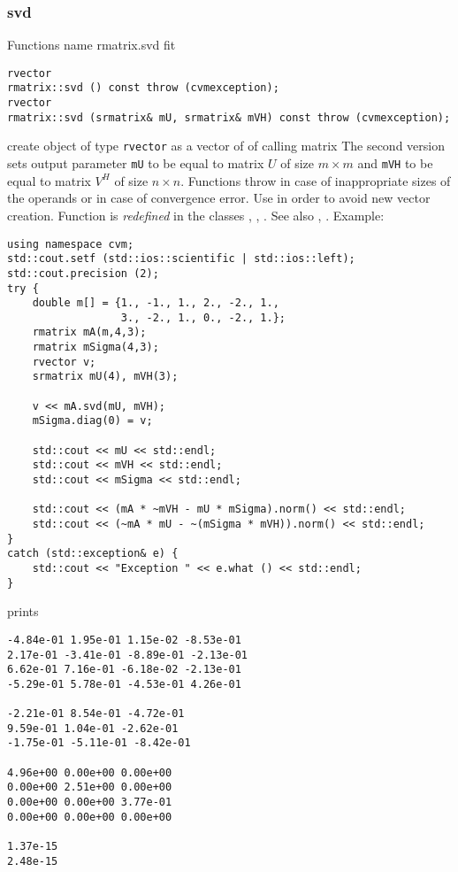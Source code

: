 \subsubsection{svd}
Functions%
\pdfdest name {rmatrix.svd} fit
\begin{verbatim}
rvector
rmatrix::svd () const throw (cvmexception);
rvector
rmatrix::svd (srmatrix& mU, srmatrix& mVH) const throw (cvmexception);
\end{verbatim}
create  object of type \verb"rvector"
as a vector of
 of  calling matrix
The second version 
sets output parameter \verb"mU" to be equal
to matrix $U$ of size $m\times m$ and
\verb"mVH" to be equal
to matrix $V^H$ of size $n\times n$.
Functions throw
in case of inappropriate sizes of the operands
or in case of convergence error.
Use  in order to avoid new vector creation.
Function is \emph{redefined} in the classes , ,
.
See also
,
.
Example:
\begin{Verbatim}
using namespace cvm;
std::cout.setf (std::ios::scientific | std::ios::left);
std::cout.precision (2);
try {
    double m[] = {1., -1., 1., 2., -2., 1.,
                  3., -2., 1., 0., -2., 1.};
    rmatrix mA(m,4,3);
    rmatrix mSigma(4,3);
    rvector v;
    srmatrix mU(4), mVH(3);

    v << mA.svd(mU, mVH);
    mSigma.diag(0) = v;

    std::cout << mU << std::endl;
    std::cout << mVH << std::endl;
    std::cout << mSigma << std::endl;

    std::cout << (mA * ~mVH - mU * mSigma).norm() << std::endl;
    std::cout << (~mA * mU - ~(mSigma * mVH)).norm() << std::endl;
}
catch (std::exception& e) {
    std::cout << "Exception " << e.what () << std::endl;
}
\end{Verbatim}
prints
\begin{Verbatim}
-4.84e-01 1.95e-01 1.15e-02 -8.53e-01
2.17e-01 -3.41e-01 -8.89e-01 -2.13e-01
6.62e-01 7.16e-01 -6.18e-02 -2.13e-01
-5.29e-01 5.78e-01 -4.53e-01 4.26e-01

-2.21e-01 8.54e-01 -4.72e-01
9.59e-01 1.04e-01 -2.62e-01
-1.75e-01 -5.11e-01 -8.42e-01

4.96e+00 0.00e+00 0.00e+00
0.00e+00 2.51e+00 0.00e+00
0.00e+00 0.00e+00 3.77e-01
0.00e+00 0.00e+00 0.00e+00

1.37e-15
2.48e-15
\end{Verbatim}
\newpage



